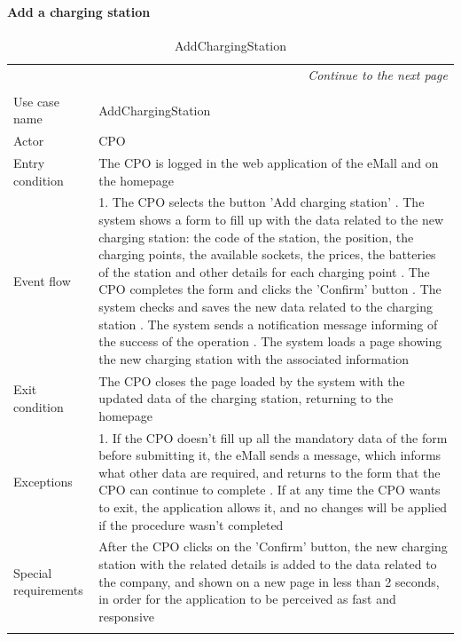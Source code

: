 \paragraph{Add a charging station}
\begin{center}
    \begin{longtable}{p{4cm} p{11cm}}
    \multicolumn{2}{r}{\itshape{Continue to the next page}}\\
    \endfoot 
    \\
    \endlastfoot
    \hline
     Use case name &  AddChargingStation\\
     \hline
     Actor & CPO \\
     \hline
     Entry condition & The CPO is logged in the web application of the eMall and on the homepage \\
     \hline
     Event flow &   1. The CPO selects the button 'Add charging station' \newline
                    2. The system shows a form to fill up with the data related to the new charging station: the code of the station, the position, the charging points, the available sockets, the prices, the batteries of the station and other details for each charging point \newline
                    3. The CPO completes the form and clicks the 'Confirm' button \newline
                    4. The system checks and saves the new data related to the charging station \newline
                    5. The system sends a notification message informing of the success of the operation \newline
                    6. The system loads a page showing the new charging station with the associated information\\
     \hline
     Exit condition &  The CPO closes the page loaded by the system with the updated data of the charging station, returning to the homepage \\
     \hline
     Exceptions &   1. If the CPO doesn't fill up all the mandatory data of the form before submitting it, the eMall                sends a message, which informs what other data are required, and returns to the form that the                   CPO can continue to complete \newline
                    2. If at any time the CPO wants to exit, the application allows it, and no changes will be applied if the procedure wasn't completed \\
     \hline
     Special requirements & After the CPO clicks on the 'Confirm' button, the new charging station with the related details is added to the data related to the company, and shown on a new page in less than 2 seconds, in order for the application to be perceived as fast and responsive \\
     \hline
    \caption{AddChargingStation}
    \label{tab:AddChargingStation}
    \end{longtable}
\end{center}

